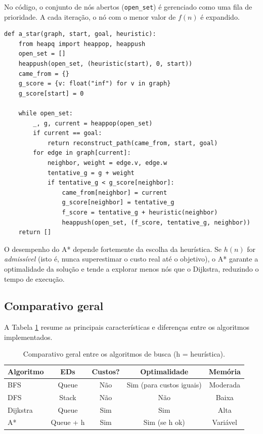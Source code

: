 \documentclass[12pt,a4paper]{article}
\begin{document}
No código, o conjunto de nós abertos (\texttt{open\_set}) é gerenciado como uma fila de prioridade. A cada iteração, o nó com o menor valor de \( f(n) \) é expandido.

\begin{lstlisting}[caption={Trecho da função A*.}]
def a_star(graph, start, goal, heuristic):
    from heapq import heappop, heappush
    open_set = []
    heappush(open_set, (heuristic(start), 0, start))
    came_from = {}
    g_score = {v: float("inf") for v in graph}
    g_score[start] = 0
    
    while open_set:
        _, g, current = heappop(open_set)
        if current == goal:
            return reconstruct_path(came_from, start, goal)
        for edge in graph[current]:
            neighbor, weight = edge.v, edge.w
            tentative_g = g + weight
            if tentative_g < g_score[neighbor]:
                came_from[neighbor] = current
                g_score[neighbor] = tentative_g
                f_score = tentative_g + heuristic(neighbor)
                heappush(open_set, (f_score, tentative_g, neighbor))
    return []
\end{lstlisting}

O desempenho do A* depende fortemente da escolha da heurística. 
Se \( h(n) \) for \textit{admissível} (isto é, nunca superestimar o custo real até o objetivo), o A* garante a optimalidade da solução e tende a explorar menos nós que o Dijkstra, reduzindo o tempo de execução.

\subsection{Comparativo geral}
A Tabela \ref{tab:comparativo} resume as principais características e diferenças entre os algoritmos implementados.

\begin{table}[H]
\centering
\caption{Comparativo geral entre os algoritmos de busca (h = heurística).}
\label{tab:comparativo}
\begin{tabular}{|l|c|c|c|c|}
\hline
\textbf{Algoritmo} & \textbf{EDs} & \textbf{Custos?} & \textbf{Optimalidade} & \textbf{Memória}\\
\hline
BFS & Queue & Não & Sim (para custos iguais) & Moderada \\
\hline
DFS & Stack & Não & Não & Baixa \\
\hline
Dijkstra & Queue & Sim & Sim & Alta \\
\hline
A* & Queue + h & Sim & Sim (se h ok) & Variável \\
\hline
\end{tabular}
\end{table}
\end{document}
